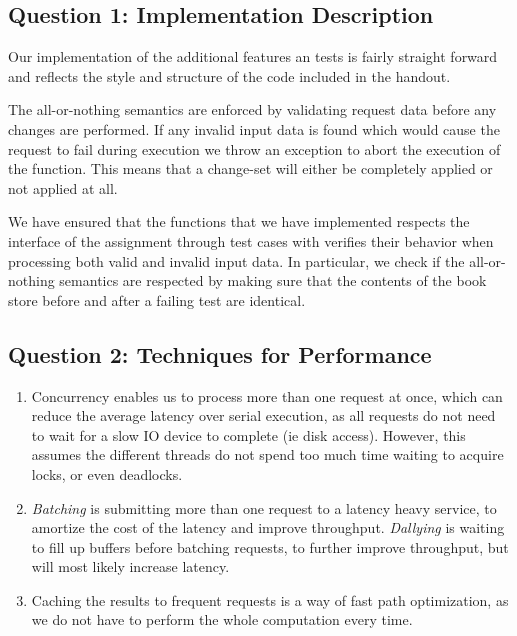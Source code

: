 \documentclass[11pt,a4paper,english]{article}
\begin{document}
\subsection{Question 1: Implementation Description}
Our implementation of the additional features an tests is fairly straight
forward and reflects the style and structure of the code included in the
handout.

The all-or-nothing semantics are enforced by validating request data before any
changes are performed. If any invalid input data is found which would cause the
request to fail during execution we throw an exception to abort the execution of
the function. This means that a change-set will either be completely applied or
not applied at all.

We have ensured that the functions that we have implemented respects the
interface of the assignment through test cases with verifies their behavior when
processing both valid and invalid input data. In particular, we check if the
all-or-nothing semantics are respected by making sure that the contents of the
book store before and after a failing test are identical.

\subsection{Question 2: Techniques for Performance}

\begin{enumerate}
\item Concurrency enables us to process more than one request at once, which can
  reduce the average latency over serial execution, as all requests do not need
  to wait for a slow IO device to complete (ie disk access). However, this
  assumes the different threads do not spend too much time waiting to acquire
  locks, or even deadlocks.

\item \emph{Batching} is submitting more than one request to a latency heavy
  service, to amortize the cost of the latency and improve
  throughput. \emph{Dallying} is waiting to fill up buffers before batching
  requests, to further improve throughput, but will most likely increase
  latency.

\item Caching the results to frequent requests is a way of fast path
  optimization, as we do not have to perform the whole computation every time.
\end{enumerate}

\newpage
\end{document}
